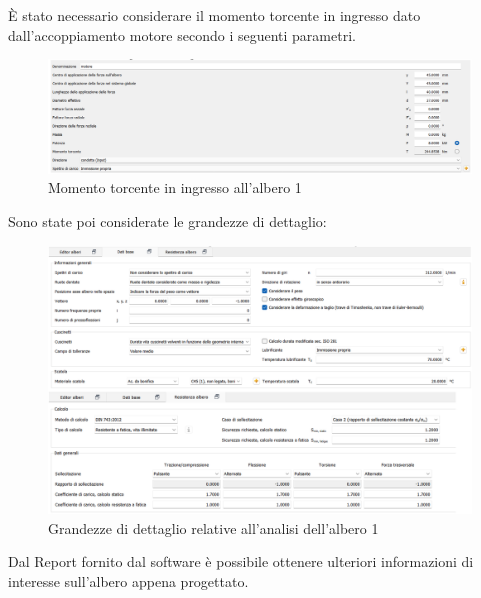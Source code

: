 È stato necessario considerare il momento torcente in ingresso dato dall'accoppiamento motore secondo i seguenti parametri.
\begin{figure}[h]
    \centering
    \includegraphics[scale=0.4]{Immagini/MomentoAlbero1.png}
    \caption{Momento torcente in ingresso all'albero 1}
    \label{fig:MomentoAlbero1}
\end{figure}
\newpage
Sono state poi considerate le grandezze di dettaglio:
\begin{figure}[h]
    \centering
    \includegraphics[scale=0.4]{Immagini/DettagliAlbero1.png}
    \caption{Grandezze di dettaglio relative all'analisi dell'albero 1}
    \label{fig:DettagliAlbero1}
\end{figure}

Dal Report fornito dal software è possibile ottenere ulteriori informazioni di interesse sull'albero appena progettato. 

